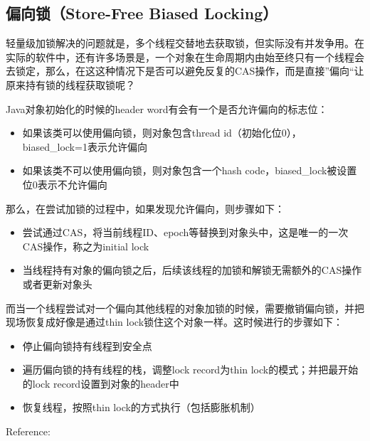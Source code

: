 \documentclass[12pt]{article}
\begin{document}
\subsection{偏向锁（Store-Free Biased Locking）}\label{ux504fux5411ux9501store-free-biased-locking}

轻量级加锁解决的问题就是，多个线程交替地去获取锁，但实际没有并发争用。在实际的软件中，还有许多场景是，一个对象在生命周期内由始至终只有一个线程会去锁定，那么，在这这种情况下是否可以避免反复的CAS操作，而是直接''偏向``让原来持有锁的线程获取锁呢？

Java对象初始化的时候的header word有会有一个是否允许偏向的标志位：

\begin{itemize}
\tightlist
\item
  如果该类可以使用偏向锁，则对象包含thread id（初始化位0），biased\_lock=1表示允许偏向
\item
  如果该类不可以使用偏向锁，则对象包含一个hash code，biased\_lock被设置位0表示不允许偏向
\end{itemize}

那么，在尝试加锁的过程中，如果发现允许偏向，则步骤如下：

\begin{itemize}
\tightlist
\item
  尝试通过CAS，将当前线程ID、epoch等替换到对象头中，这是唯一的一次CAS操作，称之为initial lock
\item
  当线程持有对象的偏向锁之后，后续该线程的加锁和解锁无需额外的CAS操作或者更新对象头
\end{itemize}

而当一个线程尝试对一个偏向其他线程的对象加锁的时候，需要撤销偏向锁，并把现场恢复成好像是通过thin lock锁住这个对象一样。这时候进行的步骤如下：

\begin{itemize}
\tightlist
\item
  停止偏向锁持有线程到安全点
\item
  遍历偏向锁的持有线程的栈，调整lock record为thin lock的模式；并把最开始的lock record设置到对象的header中
\item
  恢复线程，按照thin lock的方式执行（包括膨胀机制）
\end{itemize}

Reference:
\end{document}
